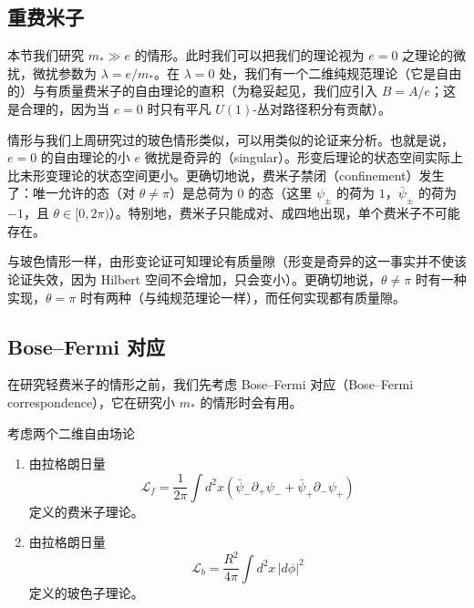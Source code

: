 
\subsection{重费米子}

本节我们研究 $m_*\gg e$ 的情形。此时我们可以把我们的理论视为 $e=0$ 之理论的微扰，微扰参数为 $\lambda=e/m_*$。在 $\lambda=0$ 处，我们有一个二维纯规范理论（它是自由的）与有质量费米子的自由理论的直积（为稳妥起见，我们应引入 $B=A/e$；这是合理的，因为当 $e=0$ 时只有平凡 $U(1)$-丛对路径积分有贡献）。

情形与我们上周研究过的玻色情形类似，可以用类似的论证来分析。也就是说，$e=0$ 的自由理论的小 $e$ 微扰是奇异的（singular）。形变后理论的状态空间实际上比未形变理论的状态空间更小。更确切地说，费米子禁闭（confinement）发生了：唯一允许的态（对 $\theta\ne\pi$）是总荷为 $0$ 的态（这里 $\psi_\pm$ 的荷为 $1$，$\bar\psi_\pm$ 的荷为 $-1$，且 $\theta\in[0,2\pi)$）。特别地，费米子只能成对、成四地出现，单个费米子不可能存在。

与玻色情形一样，由形变论证可知理论有质量隙（形变是奇异的这一事实并不使该论证失效，因为 Hilbert 空间不会增加，只会变小）。更确切地说，$\theta\ne\pi$ 时有一种实现，$\theta=\pi$ 时有两种（与纯规范理论一样），而任何实现都有质量隙。

\subsection{Bose–Fermi 对应}

在研究轻费米子的情形之前，我们先考虑 Bose–Fermi 对应（Bose–Fermi correspondence），它在研究小 $m_*$ 的情形时会有用。

考虑两个二维自由场论

\begin{enumerate}
\item 由拉格朗日量
\begin{equation}
  \tag{6.10}
  \label{eq:6-10}
  \mathcal{L}_f=\frac{1}{2\pi}\int d^2x\left(\bar\psi_-\partial_+\psi_-+\bar\psi_+\partial_-\psi_+\right)
\end{equation}
定义的费米子理论。

\item 由拉格朗日量
\begin{equation}
  \tag{6.11}
  \label{eq:6-11}
  \mathcal{L}_b=\frac{R^2}{4\pi}\int d^2x\,|d\phi|^2
\end{equation}
定义的玻色子理论。
\end{enumerate}


